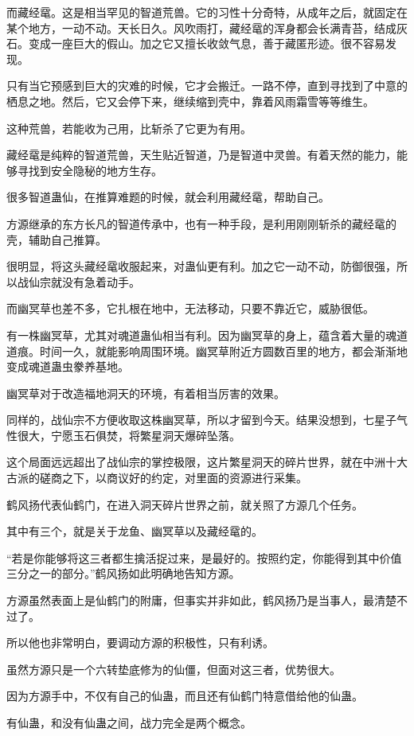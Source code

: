 \begin{this_body}
而藏经鼋。这是相当罕见的智道荒兽。它的习性十分奇特，从成年之后，就固定在某个地方，一动不动。天长日久。风吹雨打，藏经鼋的浑身都会长满青苔，结成灰石。变成一座巨大的假山。加之它又擅长收敛气息，善于藏匿形迹。很不容易发现。

只有当它预感到巨大的灾难的时候，它才会搬迁。一路不停，直到寻找到了中意的栖息之地。然后，它又会停下来，继续缩到壳中，靠着风雨霜雪等等维生。

这种荒兽，若能收为己用，比斩杀了它更为有用。

藏经鼋是纯粹的智道荒兽，天生贴近智道，乃是智道中灵兽。有着天然的能力，能够寻找到安全隐秘的地方生存。

很多智道蛊仙，在推算难题的时候，就会利用藏经鼋，帮助自己。

方源继承的东方长凡的智道传承中，也有一种手段，是利用刚刚斩杀的藏经鼋的壳，辅助自己推算。

很明显，将这头藏经鼋收服起来，对蛊仙更有利。加之它一动不动，防御很强，所以战仙宗就没有急着动手。

而幽冥草也差不多，它扎根在地中，无法移动，只要不靠近它，威胁很低。

有一株幽冥草，尤其对魂道蛊仙相当有利。因为幽冥草的身上，蕴含着大量的魂道道痕。时间一久，就能影响周围环境。幽冥草附近方圆数百里的地方，都会渐渐地变成魂道蛊虫豢养基地。

幽冥草对于改造福地洞天的环境，有着相当厉害的效果。

同样的，战仙宗不方便收取这株幽冥草，所以才留到今天。结果没想到，七星子气性很大，宁愿玉石俱焚，将繁星洞天爆碎坠落。

这个局面远远超出了战仙宗的掌控极限，这片繁星洞天的碎片世界，就在中洲十大古派的磋商之下，以商议好的约定，对里面的资源进行采集。

鹤风扬代表仙鹤门，在进入洞天碎片世界之前，就关照了方源几个任务。

其中有三个，就是关于龙鱼、幽冥草以及藏经鼋的。

“若是你能够将这三者都生擒活捉过来，是最好的。按照约定，你能得到其中价值三分之一的部分。”鹤风扬如此明确地告知方源。

方源虽然表面上是仙鹤门的附庸，但事实并非如此，鹤风扬乃是当事人，最清楚不过了。

所以他也非常明白，要调动方源的积极性，只有利诱。

虽然方源只是一个六转垫底修为的仙僵，但面对这三者，优势很大。

因为方源手中，不仅有自己的仙蛊，而且还有仙鹤门特意借给他的仙蛊。

有仙蛊，和没有仙蛊之间，战力完全是两个概念。


\end{this_body}
